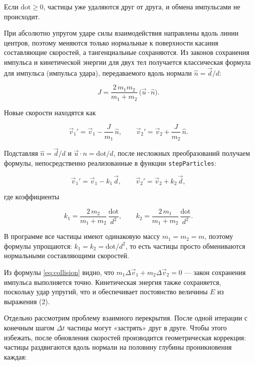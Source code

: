 \documentclass[a4paper]{article}
\begin{document}
Если $\mathrm{dot} \ge 0$, частицы уже удаляются друг от друга, и обмена импульсами не происходит.

При абсолютно упругом ударе силы взаимодействия направлены вдоль линии центров, поэтому меняются только нормальные к поверхности касания составляющие скоростей, а тангенциальные сохраняются. Из законов сохранения импульса и кинетической энергии для двух тел получается классическая формула для импульса (импульса удара), передаваемого вдоль нормали $\hat{n} = \vec{d}/d$:

\begin{equation}
    J = \frac{2\,m_1 m_2}{m_1 + m_2}\,\bigl(\vec{u}\cdot\hat{n}\bigr).
\end{equation}

Новые скорости находятся как

\begin{equation}
    \vec{v}_1' = \vec{v}_1 - \frac{J}{m_1}\,\hat{n}, \qquad
    \vec{v}_2' = \vec{v}_2 + \frac{J}{m_2}\,\hat{n}.
\end{equation}

Подставляя $\hat{n} = \vec{d}/d$ и $\vec{u}\cdot\hat{n} = \mathrm{dot}/d$, после несложных преобразований получаем формулы, непосредственно реализованные в функции \texttt{stepParticles}:

\begin{equation}
    \vec{v}_1' = \vec{v}_1 - k_1\,\vec{d}, \qquad
    \vec{v}_2' = \vec{v}_2 + k_2\,\vec{d},
    \label{eq:collision}
\end{equation}

где коэффициенты

\begin{equation}
    k_1 = \frac{2\,m_2}{m_1 + m_2}\,\frac{\mathrm{dot}}{d^2}, \qquad
    k_2 = \frac{2\,m_1}{m_1 + m_2}\,\frac{\mathrm{dot}}{d^2}.
\end{equation}

В программе все частицы имеют одинаковую массу $m_1 = m_2 = m$, поэтому формулы упрощаются: $k_1 = k_2 = \mathrm{dot}/d^2$, то есть частицы просто обмениваются нормальными составляющими скоростей.

Из формулы \eqref{eq:collision} видно, что $m_1 \Delta\vec{v}_1 + m_2 \Delta\vec{v}_2 = 0$ --- закон сохранения импульса выполняется точно. Кинетическая энергия также сохраняется, поскольку удар упругий, что и обеспечивает постоянство величины $E$ из выражения (2).

Отдельно рассмотрим проблему взаимного перекрытия. После одной итерации с конечным шагом $\Delta t$ частицы могут «застрять» друг в друге. Чтобы этого избежать, после обновления скоростей производится геометрическая коррекция: частицы раздвигаются вдоль нормали на половину глубины проникновения каждая:
\end{document}
